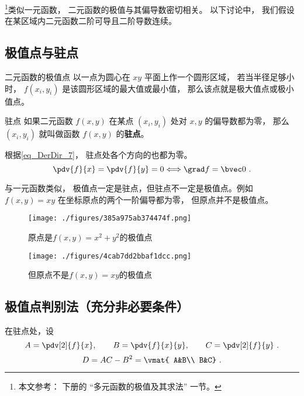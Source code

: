 

\footnote{本文参考： \cite{同济高} 下册的 “多元函数的极值及其求法” 一节。}类似一元函数， 二元函数的极值与其偏导数密切相关。 以下讨论中， 我们假设在某区域内二元函数二阶可导且二阶导数连续。

\subsection{极值点与驻点}
\begin{definition}{二元函数的极值点}
以一点为圆心在 $xy$ 平面上作一个圆形区域， 若当半径足够小时， $f(x_i, y_i)$ 是该圆形区域的最大值或最小值， 那么该点就是极大值点或极小值点。 
\end{definition}

\begin{definition}{驻点}
如果二元函数 $f(x,y)$ 在某点 $(x_i, y_i)$ 处对 $x, y$ 的偏导数都为零， 那么 $(x_i, y_i)$ 就叫做函数 $f(x,y)$ 的\textbf{驻点}。 
\end{definition}
根据\autoref{eq_DerDir_7}， 驻点处各个方向的也都为零。
\begin{equation}
\pdv{f}{x}=\pdv{f}{y}=0 \Longleftrightarrow \grad f=\bvec0~.
\end{equation}

与一元函数类似， 极值点一定是驻点，但驻点不一定是极值点。例如 $f(x,y) = xy$ 在坐标原点的两个一阶偏导都为零， 但原点并不是极值点。 

\begin{figure}[ht]
\centering
\texttt{[image: ./figures/385a975ab374474f.png]}
\caption{原点是$f(x,y)=x^2+y^2$的极值点} \label{fig_F2Exm_1}
\end{figure}


\begin{figure}[ht]
\centering
\texttt{[image: ./figures/4cab7dd2bbaf1dcc.png]}
\caption{但原点不是$f(x,y)=xy$的极值点} \label{fig_F2Exm_2}
\end{figure}

\subsection{极值点判别法（充分非必要条件）}
在驻点处，设
\begin{equation}
A=\pdv[2]{f}{x},\qquad B=\pdv{f}{x}{y},\qquad C=\pdv[2]{f}{y}~.
\end{equation}
\begin{equation}
D=AC-B^2=
\vmat{
A&B\\
B&C}~.
\end{equation}

